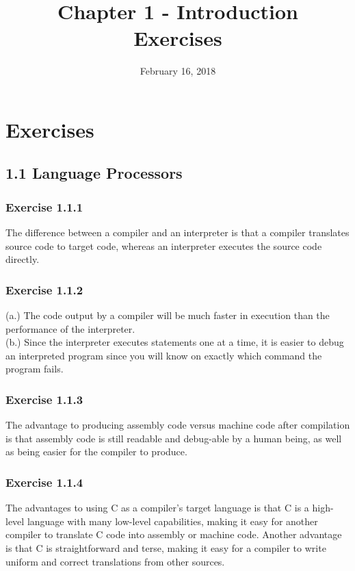 \documentclass{article}
\title{Chapter 1 - Introduction\\
Exercises}
\date{February 16, 2018}
\begin{document}
\maketitle
{}

\section*{Exercises}

\subsection*{1.1 Language Processors}
\subsubsection*{Exercise 1.1.1}

The difference between a compiler and an interpreter is that a compiler translates source code to target code, whereas an interpreter executes the source code directly.

\subsubsection*{Exercise 1.1.2}

(a.) The code output by a compiler will be much faster in execution than the performance of the interpreter. \\
(b.) Since the interpreter executes statements one at a time, it is easier to debug an interpreted program since you will know on exactly which command the program fails. 

\subsubsection*{Exercise 1.1.3}

The advantage to producing assembly code versus machine code after compilation is that assembly code is still readable and debug-able by a human being, as well as being easier for the compiler to produce.

\subsubsection*{Exercise 1.1.4}

The advantages to using C as a compiler's target language is that C is a high-level language with many low-level capabilities, making it easy for another compiler to translate C code into assembly or machine code. Another advantage is that C is straightforward and terse, making it easy for a compiler to write uniform and correct translations from other sources.
\end{document}
